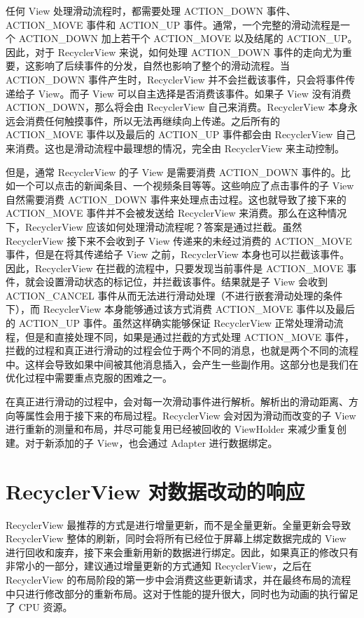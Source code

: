 任何 View 处理滑动流程时，都需要处理 ACTION\_DOWN 事件、ACTION\_MOVE 事件和 ACTION\_UP 事件。通常，一个完整的滑动流程是一个 ACTION\_DOWN 加上若干个 ACTION\_MOVE 以及结尾的 ACTION\_UP。因此，对于 RecyclerView 来说，如何处理 ACTION\_DOWN 事件的走向尤为重要，这影响了后续事件的分发，自然也影响了整个的滑动流程。当 ACTION\_DOWN 事件产生时，RecyclerView 并不会拦截该事件，只会将事件传递给子 View。而子 View 可以自主选择是否消费该事件。如果子 View 没有消费 ACTION\_DOWN，那么将会由 RecyclerView 自己来消费。RecyclerView 本身永远会消费任何触摸事件，所以无法再继续向上传递。之后所有的 ACTION\_MOVE 事件以及最后的 ACTION\_UP 事件都会由 RecyclerView 自己来消费。这也是滑动流程中最理想的情况，完全由 RecyclerView 来主动控制。

但是，通常 RecyclerView 的子 View 是需要消费 ACTION\_DOWN 事件的。比如一个可以点击的新闻条目、一个视频条目等等。这些响应了点击事件的子 View 自然需要消费 ACTION\_DOWN 事件来处理点击过程。这也就导致了接下来的 ACTION\_MOVE 事件并不会被发送给 RecyclerView 来消费。那么在这种情况下，RecyclerView 应该如何处理滑动流程呢？答案是通过拦截。虽然 RecyclerView 接下来不会收到子 View 传递来的未经过消费的 ACTION\_MOVE 事件，但是在将其传递给子 View 之前，RecyclerView 本身也可以拦截该事件。因此，RecyclerView 在拦截的流程中，只要发现当前事件是 ACTION\_MOVE 事件，就会设置滑动状态的标记位，并拦截该事件。结果就是子 View 会收到 ACTION\_CANCEL 事件从而无法进行滑动处理（不进行嵌套滑动处理的条件下），而 RecyclerView 本身能够通过该方式消费 ACTION\_MOVE 事件以及最后的 ACTION\_UP 事件。虽然这样确实能够保证 RecyclerView 正常处理滑动流程，但是和直接处理不同，如果是通过拦截的方式处理 ACTION\_MOVE 事件，拦截的过程和真正进行滑动的过程会位于两个不同的消息，也就是两个不同的流程中。这样会导致如果中间被其他消息插入，会产生一些副作用。这部分也是我们在优化过程中需要重点克服的困难之一。

在真正进行滑动的过程中，会对每一次滑动事件进行解析。解析出的滑动距离、方向等属性会用于接下来的布局过程。RecyclerView 会对因为滑动而改变的子 View 进行重新的测量和布局，并尽可能复用已经被回收的 ViewHolder 来减少重复创建。对于新添加的子 View，也会通过 Adapter 进行数据绑定。

\section{RecyclerView 对数据改动的响应}

RecyclerView 最推荐的方式是进行增量更新，而不是全量更新。全量更新会导致 RecyclerView 整体的刷新，同时会将所有已经位于屏幕上绑定数据完成的 View 进行回收和废弃，接下来会重新用新的数据进行绑定。因此，如果真正的修改只有非常小的一部分，建议通过增量更新的方式通知 RecyclerView，之后在 RecyclerView 的布局阶段的第一步中会消费这些更新请求，并在最终布局的流程中只进行修改部分的重新布局。这对于性能的提升很大，同时也为动画的执行留足了 CPU 资源。

